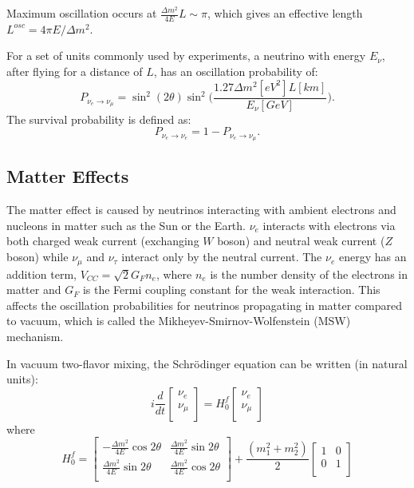 \documentclass[preprint,12pt]{elsarticle}
\numberwithin{equation}{section}
\begin{document}
Maximum oscillation occurs at $\frac{\Delta m^2}{4E}L\sim \pi$, which gives an effective length $L^{osc}=4\pi E/\Delta m^2$.

For a set of units commonly used by experiments, a neutrino with energy $E_\nu$, after flying for a distance of $L$, has an oscillation probability of: 
\begin{equation}
P_{\nu_e\to\nu_{\mu}}=\sin^2(2\theta)\sin^2\Big(\frac{1.27\Delta m^2[eV^2]L[km]}{E_\nu[GeV]}\Big).
\end{equation}
The survival probability is defined as:
\begin{equation}
P_{\nu_e\to\nu_e}=1-P_{\nu_e\to\nu_{\mu}}.
\end{equation}

\subsection{Matter Effects}
The matter effect is caused by neutrinos interacting with ambient electrons and nucleons in matter such as the Sun or the Earth. $\nu_e$ interacts with electrons via both charged weak current (exchanging $W$ boson) and neutral weak current ($Z$ boson) while $\nu_\mu$ and $\nu_\tau$ interact only by the neutral current. The $\nu_e$ energy has an addition term, $V_{CC} =\sqrt2G_Fn_e$, where $n_e$ is the number density of the electrons in matter and $G_F$ is the Fermi coupling constant for the weak interaction. This affects the oscillation probabilities for neutrinos propagating in matter compared to vacuum, which is called the Mikheyev-Smirnov-Wolfenstein (MSW) mechanism\cite{smirnov,smirnov_msw}.

In vacuum two-flavor mixing, the Schr\"{o}dinger equation can be written (in natural units)\cite{xing}:
\begin{equation}\label{eq:2flavor_simple}
i\frac{d}{dt}\begin{bmatrix}
\nu_e\\
\nu_\mu\\
\end{bmatrix}
=
H^f_0
\begin{bmatrix}
\nu_e\\
\nu_\mu\\
\end{bmatrix}
\end{equation}
where 
\begin{equation}\label{eq:H0f}
H^f_0 = \begin{bmatrix}
-\frac{\Delta m^2}{4E}\cos 2\theta & \frac{\Delta m^2}{4E}\sin 2\theta\\
\frac{\Delta m^2}{4E}\sin 2\theta &\frac{\Delta m^2}{4E}\cos 2\theta\\
\end{bmatrix}+\frac{(m_1^2+m_2^2)}{2}\begin{bmatrix}
1 & 0\\
0 &1\\
\end{bmatrix}
\end{equation}
\end{document}
